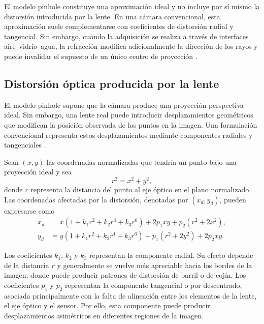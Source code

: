 \documentclass{report}
\begin{document}
El modelo pinhole constituye una aproximación ideal y no incluye por sí mismo la distorsión introducida por la lente. En una cámara convencional, esta aproximación suele complementarse con coeficientes de distorsión radial y tangencial. Sin embargo, cuando la adquisición se realiza a través de interfaces aire--vidrio--agua, la refracción modifica adicionalmente la dirección de los rayos y puede invalidar el supuesto de un único centro de proyección \parencite{Treibitz2012,Seegraber2025}.

\subsection{Distorsión óptica producida por la lente}

El modelo pinhole supone que la cámara produce una proyección perspectiva ideal. Sin embargo, una lente real puede introducir desplazamientos geométricos que modifican la posición observada de los puntos en la imagen. Una formulación convencional representa estos desplazamientos mediante componentes radiales y tangenciales \parencite{Brown1966,Weng1992}.

Sean $(x, y)$ las coordenadas normalizadas que tendría un punto bajo una proyección ideal y sea
\begin{equation}
r^2 = x^2 + y^2,
\end{equation}
donde $r$ representa la distancia del punto al eje óptico en el plano normalizado. Las coordenadas afectadas por la distorsión, denotadas por $(x_d, y_d)$, pueden expresarse como
\begin{equation}
\begin{aligned}
x_d &= x\left(1 + k_1 r^2 + k_2 r^4 + k_3 r^6\right) + 2p_1 xy + p_2\left(r^2 + 2x^2\right),\\
y_d &= y\left(1 + k_1 r^2 + k_2 r^4 + k_3 r^6\right) + p_1\left(r^2 + 2y^2\right) + 2p_2 xy.
\end{aligned}
\label{eq:distorsion}
\end{equation}

Los coeficientes $k_1$, $k_2$ y $k_3$ representan la componente radial. Su efecto depende de la distancia $r$ y generalmente se vuelve más apreciable hacia los bordes de la imagen, donde puede producir patrones de distorsión de barril o de cojín. Los coeficientes $p_1$ y $p_2$ representan la componente tangencial o por descentrado, asociada principalmente con la falta de alineación entre los elementos de la lente, el eje óptico y el sensor. Por ello, esta componente puede producir desplazamientos asimétricos en diferentes regiones de la imagen.
\end{document}
